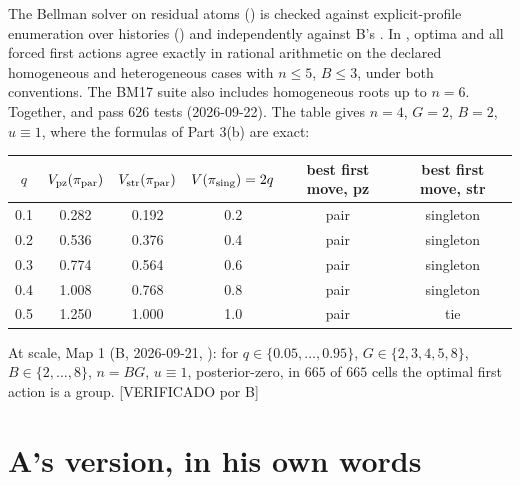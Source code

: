 \documentclass[11pt]{article}
\theoremstyle{remark}
\newcommand{\pz}{\mathrm{pz}}
\newcommand{\str}{\mathrm{str}}
\newcommand{\lab}[1]{\textcolor{blue!60!black}{\textsf{\small [#1]}}}
\begin{document}
The Bellman solver on residual atoms () is checked against explicit-profile enumeration over histories () and independently against B's . In , optima and all forced first actions agree exactly in rational arithmetic on the declared homogeneous and heterogeneous cases with $n\le5$, $B\le3$, under both conventions. The BM17 suite also includes homogeneous roots up to $n=6$. Together,  and  pass 626 tests (2026-09-22). The table gives $n=4$, $G=2$, $B=2$, $u\equiv1$, where the formulas of Part 3(b) are exact:
\begin{center}
\begin{tabular}{cccccc}
\toprule
$q$ & $V_\pz(\pi_{\rm par})$ & $V_\str(\pi_{\rm par})$ & $V(\pi_{\rm sing})=2q$ & best first move, pz & best first move, str \\
\midrule
0.1 & 0.282 & 0.192 & 0.2 & pair & singleton \\
0.2 & 0.536 & 0.376 & 0.4 & pair & singleton \\
0.3 & 0.774 & 0.564 & 0.6 & pair & singleton \\
0.4 & 1.008 & 0.768 & 0.8 & pair & singleton \\
0.5 & 1.250 & 1.000 & 1.0 & pair & tie \\
\bottomrule
\end{tabular}
\end{center}
At scale, Map 1 (B, 2026-09-21, ): for $q\in\{0.05,\dots,0.95\}$, $G\in\{2,3,4,5,8\}$, $B\in\{2,\dots,8\}$, $n=BG$, $u\equiv1$, posterior-zero, in $665$ of $665$ cells the optimal first action is a group. \lab{VERIFICADO por B}

\section{A's version, in his own words}
\end{document}
